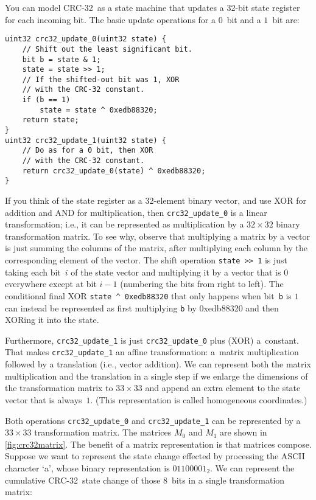 \documentclass[letterpaper,twocolumn,10pt]{article}
\newcommand{\CRC}{\mbox{CRC-32}}
\begin{document}
You can model \CRC\ as a state machine that updates a 32-bit state register
for each incoming bit.
The basic update operations for a $0$~bit and a $1$~bit are:
{
\small
\begin{verbatim}
uint32 crc32_update_0(uint32 state) {
    // Shift out the least significant bit.
    bit b = state & 1;
    state = state >> 1;
    // If the shifted-out bit was 1, XOR
    // with the CRC-32 constant.
    if (b == 1)
        state = state ^ 0xedb88320;
    return state;
}
uint32 crc32_update_1(uint32 state) {
    // Do as for a 0 bit, then XOR
    // with the CRC-32 constant.
    return crc32_update_0(state) ^ 0xedb88320;
}
\end{verbatim}
}

If you think of the state register as a 32-element binary vector,
and use XOR for addition and AND for multiplication, then
\texttt{crc32\_update\_0} is a linear transformation;
i.e., it can be represented as multiplication by a
$32\times32$ binary transformation matrix.
To see why, observe that multiplying a matrix by a vector
is just summing the columns of the matrix,
after multiplying each column by the corresponding element of the vector.
The shift operation \texttt{state~>{}>~1}
is just taking each bit~$i$ of the state vector
and multiplying it by a vector that is $0$ everywhere except at bit $i-1$
(numbering the bits from right to left).
The conditional final XOR \texttt{state~\^~0xedb88320}
that only happens when bit~\texttt{b} is $1$
can instead be represented as first multiplying
\texttt{b} by 0xedb88320
and then XORing it into the state.

Furthermore, \texttt{crc32\_update\_1} is just
\texttt{crc32\_update\_0} plus (XOR) a~constant.
That makes \texttt{crc32\_update\_1} an
affine transformation:
a~matrix multiplication followed by a translation (i.e., vector addition).
We can represent both the matrix multiplication and the translation
in a single step
if we enlarge the dimensions of the transformation matrix to $33\times33$
and append an extra element to the state vector that is always~$1$.
(This representation is called
homogeneous coordinates.)

Both operations \texttt{crc32\_update\_0} and \texttt{crc32\_update\_1}
can be represented by a $33\times 33$ transformation matrix.
The matrices $M_0$ and $M_1$ are shown in \autoref{fig:crc32matrix}.
The benefit of a matrix representation is that matrices compose.
Suppose we want to represent the state change effected by processing
the ASCII character `a', whose binary representation is
$01100001_2$.
We can represent the cumulative \CRC\ state change of those 8~bits
in a single transformation matrix:
\end{document}
